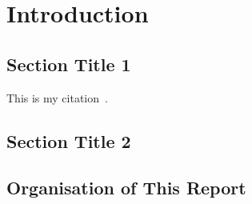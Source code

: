 \chapter{Introduction}\label{chap:introduction} 
\section{Section Title 1}\label{sec:1}
This is my citation~\citep{Wright2009}. 

\section{Section Title 2}\label{sec:2}

\section{Organisation of This Report} 








